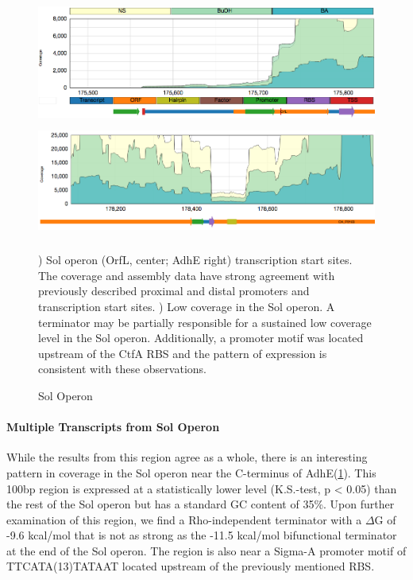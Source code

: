 \begin{figure}
\small
{\includegraphics[width=\textwidth,height=1.5in]{images/Assembly/Examples/Sol/Sol-TSS.png}
\label{fig:5.11a}}
{\includegraphics[width=\textwidth,height=1.5in]{images/Assembly/Examples/Sol/AdhE-terminator.png}
\label{fig:5.11b}}
\caption{Sol Operon}
) Sol operon (OrfL, center; AdhE right) transcription start sites. The coverage and assembly data have strong agreement with previously described proximal and distal promoters and transcription start sites. ) Low coverage in the Sol operon. A terminator may be partially responsible for a sustained low coverage level in the Sol operon. Additionally, a promoter motif was located upstream of the CtfA RBS and the pattern of expression is consistent with these observations.
\end{figure}

\paragraph{Multiple Transcripts from Sol Operon}
While the results from this region agree as a whole, there is an interesting pattern in coverage in the Sol operon near the C-terminus of AdhE(\ref{fig:5.11b}). This 100bp region is expressed at a statistically lower level (K.S.-test, p < 0.05) than the rest of the Sol operon but has a standard GC content of 35\%. Upon further examination of this region, we find a Rho-independent terminator with a \(\Delta\)G of -9.6 kcal/mol that is not as strong as the -11.5 kcal/mol bifunctional terminator at the end of the Sol operon. The region is also near a Sigma-A promoter motif of TTCATA(13)TATAAT located upstream of the previously mentioned RBS. 

